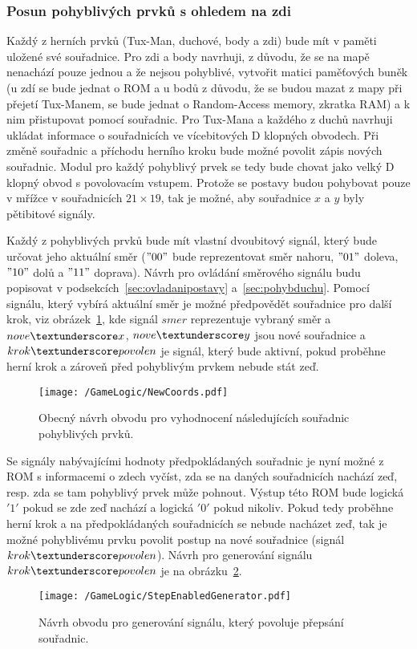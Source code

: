 \documentclass{report}
\begin{document}
\subsubsection{Posun pohyblivých prvků s ohledem na zdi}
Každý z herních prvků (Tux-Man, duchové, body a zdi) bude mít v paměti uložené své souřadnice. Pro zdi a body navrhuji, z důvodu, že se na mapě nenachází pouze jednou a že nejsou pohyblivé, vytvořit matici paměťových buněk (u zdí se bude jednat o ROM a u bodů z důvodu, že se budou mazat z mapy při přejetí Tux-Manem, se bude jednat o Random-Access memory, zkratka RAM) a k nim přistupovat pomocí souřadnic. Pro Tux-Mana a každého z duchů navrhuji ukládat informace o souřadnicích ve vícebitových D klopných obvodech. Při změně souřadnic a příchodu herního kroku bude možné povolit zápis nových souřadnic. Modul pro každý pohyblivý prvek se tedy bude chovat jako velký D klopný obvod s povolovacím vstupem. Protože se postavy budou pohybovat pouze v mřížce v souřadnicích $21 × 19$, tak je možné, aby souřadnice $x$ a $y$ byly pětibitové signály. \par
Každý z pohyblivých prvků bude mít vlastní dvoubitový signál, který bude určovat jeho aktuální směr ($"00"$ bude reprezentovat směr nahoru, $"01"$ doleva, $"10"$ dolů a $"11"$ doprava). Návrh pro ovládání směrového signálu budu popisovat v podsekcích~\ref{sec:ovladanipostavy} a~\ref{sec:pohybduchu}. Pomocí signálu, který vybírá aktuální směr je možné předpovědět souřadnice pro další krok, viz obrázek~\ref{fig:newcoords}, kde signál $smer$ reprezentuje vybraný směr a $nove\textunderscore x$, $nove\textunderscore y$ jsou nové souřadnice a $krok\textunderscore povolen$ je signál, který bude aktivní, pokud proběhne herní krok a zároveň před pohyblivým prvkem nebude stát zeď.
\begin{figure}
\centering
\texttt{[image: /GameLogic/NewCoords.pdf]}
\caption{Obecný návrh obvodu pro vyhodnocení následujících souřadnic pohyblivých prvků.}
\label{fig:newcoords}
\end{figure}
Se signály nabývajícími hodnoty předpokládaných souřadnic je nyní možné z ROM s informacemi o zdech vyčíst, zda se na daných souřadnicích nachází zeď, resp. zda se tam pohyblivý prvek může pohnout. Výstup této ROM bude logická $'1'$ pokud se zde zeď nachází a logická $'0'$ pokud nikoliv. Pokud tedy proběhne herní krok a na předpokládaných souřadnicích se nebude nacházet zeď, tak je možné pohyblivému prvku povolit postup na nové souřadnice (signál $krok\textunderscore povolen$). Návrh pro generování signálu $krok\textunderscore povolen$ je na obrázku~\ref{fig:stepenable}.
\begin{figure}
\centering
\texttt{[image: /GameLogic/StepEnabledGenerator.pdf]}
\caption{Návrh obvodu pro generování signálu, který povoluje přepsání souřadnic.}
\label{fig:stepenable}
\end{figure}
\end{document}
